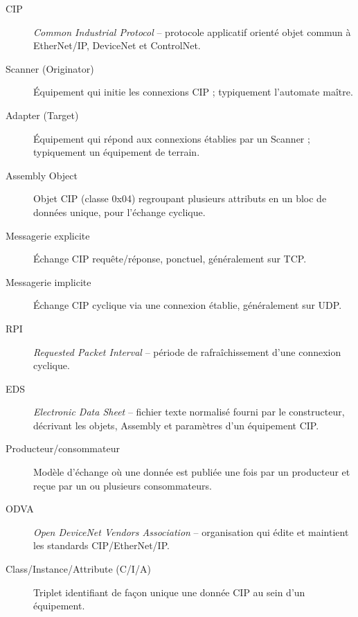 \begin{description}
    \item[CIP] \emph{Common Industrial Protocol} -- protocole applicatif orienté objet commun à EtherNet/IP, DeviceNet et ControlNet.
    \item[Scanner (Originator)] Équipement qui initie les connexions CIP ; typiquement l'automate maître.
    \item[Adapter (Target)] Équipement qui répond aux connexions établies par un Scanner ; typiquement un équipement de terrain.
    \item[Assembly Object] Objet CIP (classe 0x04) regroupant plusieurs attributs en un bloc de données unique, pour l'échange cyclique.
    \item[Messagerie explicite] Échange CIP requête/réponse, ponctuel, généralement sur TCP.
    \item[Messagerie implicite] Échange CIP cyclique via une connexion établie, généralement sur UDP.
    \item[RPI] \emph{Requested Packet Interval} -- période de rafraîchissement d'une connexion cyclique.
    \item[EDS] \emph{Electronic Data Sheet} -- fichier texte normalisé fourni par le constructeur, décrivant les objets, Assembly et paramètres d'un équipement CIP.
    \item[Producteur/consommateur] Modèle d'échange où une donnée est publiée une fois par un producteur et reçue par un ou plusieurs consommateurs.
    \item[ODVA] \emph{Open DeviceNet Vendors Association} -- organisation qui édite et maintient les standards CIP/EtherNet/IP.
    \item[Class/Instance/Attribute (C/I/A)] Triplet identifiant de façon unique une donnée CIP au sein d'un équipement.
\end{description}

